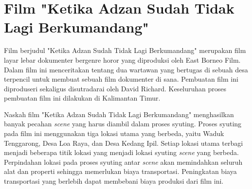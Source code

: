 \section{Film "Ketika Adzan Sudah Tidak Lagi Berkumandang"}
\vspace{-4mm}
{\frenchspacing
    Film berjudul "Ketika Adzan Sudah Tidak Lagi Berkumandang" merupakan film layar lebar dokumenter bergenre horor yang diproduksi oleh East Borneo Film.
    Dalam film ini menceritakan tentang dua wartawan yang bertugas di sebuah desa terpencil untuk membuat sebuah film dokumenter di sana.
    Pembuatan film ini diproduseri sekaligus disutradarai oleh David Richard.
    Keseluruhan proses pembuatan film ini dilakukan di Kalimantan Timur.

    Naskah film "Ketika Adzan Sudah Tidak Lagi Berkumandang" menghasilkan banyak pecahan \textit{scene} yang harus diambil dalam proses syuting.
    Proses syuting pada film ini menggunakan tiga lokasi utama yang berbeda, yaitu Waduk Tenggarong, Desa Loa Raya, dan Desa Kedang Ipil.
    Setiap lokasi utama terbagi menjadi beberapa titik lokasi yang menjadi lokasi syuting \textit{scene} yang berbeda.
    Perpindahan lokasi pada proses syuting antar \textit{scene} akan memindahkan seluruh alat dan properti sehingga memerlukan biaya transportasi.
    Peningkatan biaya transportasi yang berlebih dapat membebani biaya produksi dari film ini.
}
\vspace{-3mm}

\pagebreak